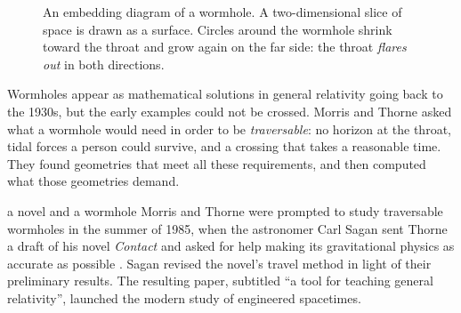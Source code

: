 \begin{figure}[htbp]
\centering
{}
\caption{An embedding diagram of a wormhole. A two-dimensional slice of space
is drawn as a surface. Circles around the wormhole shrink toward the throat and
grow again on the far side: the throat \emph{flares out} in both directions.}
\label{fig:wormhole}
\end{figure}

Wormholes appear as mathematical solutions in general relativity going back to
the 1930s, but the early examples could not be crossed. Morris and Thorne asked
what a wormhole would need in order to be \emph{traversable}: no horizon at the
throat, tidal forces a person could survive, and a crossing that takes a
reasonable time. They found geometries that meet all these requirements, and
then computed what those geometries demand.

\begin{history}{a novel and a wormhole}
Morris and Thorne were prompted to study traversable wormholes in the summer of
1985, when the astronomer Carl Sagan sent Thorne a draft of his novel
\emph{Contact} and asked for help making its gravitational physics as accurate
as possible \parencite{Morris1988a}. Sagan revised the novel's travel method
in light of their preliminary results. The resulting paper, subtitled \enquote{a
tool for teaching general relativity}, launched the modern study of engineered
spacetimes.
\end{history}

